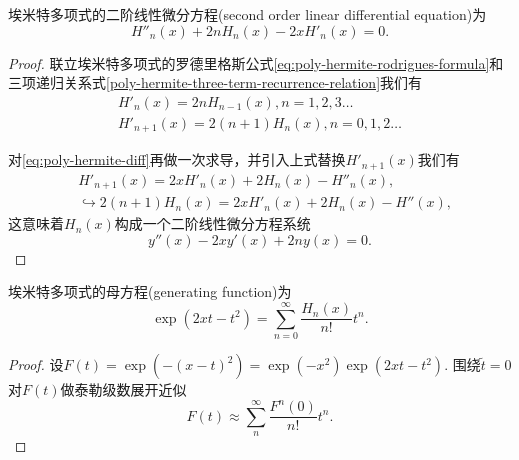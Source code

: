 \begin{subappendices}
\begin{theorem}[埃米特多项式的二阶线性微分方程]
  埃米特多项式的二阶线性微分方程(second order linear differential equation)为
  \begin{equation}
    \label{eq:poly-hermite-differential-equation}
    H''_n(x) + 2n H_n(x) - 2x H'_n(x)=0.
  \end{equation}
\end{theorem}
\begin{proof}
  联立埃米特多项式的罗德里格斯公式\eqref{eq:poly-hermite-rodrigues-formula}和三项递归关系式\eqref{poly-hermite-three-term-recurrence-relation}我们有
  \begin{equation*}
  \begin{split}
    H'_n(x) = 2n H_{n-1}(x), n=1,2,3 \ldots \\
    H'_{n+1}(x) = 2(n+1) H_{n}(x), n=0,1,2 \ldots
  \end{split}
\end{equation*}

  对\eqref{eq:poly-hermite-diff}再做一次求导，并引入上式替换$H'_{n+1}(x)$我们有
  \begin{align*}
    &H'_{n+1}(x) = 2x H'_n(x) + 2 H_n(x) - H''_n(x), \\
    &\hookrightarrow 2(n+1) H_n(x) = 2x H'_n(x) + 2H_n(x) - H''(x),
  \end{align*}
这意味着$H_n(x)$构成一个二阶线性微分方程系统
\begin{equation}
  \label{eq:poly-hermite-diff-eq}
  y''(x) - 2xy'(x) + 2n y(x)=0.
\end{equation}
\end{proof}

\begin{theorem}[埃米特多项式的母方程]
  埃米特多项式的母方程(generating function)为
  \begin{equation}
    \label{eq:poly-hermite-generating-function}
    \exp(2xt-t^2) = \sum_{n=0}^{\infty}  \frac{H_n(x)}{n!} t^n.
  \end{equation}
\end{theorem}

\begin{proof}
  设$F(t) = \exp(-(x-t)^2) = \exp(-x^2) \exp(2xt-t^2)$. 围绕$\tilde{t}=0$对$F(t)$做泰勒级数展开近似
  \begin{equation*}
    F(t) \approx \sum_{n}^{\infty} \frac{F^{n}(0)}{n!} t^n.
  \end{equation*}


\end{proof}
\end{subappendices}
